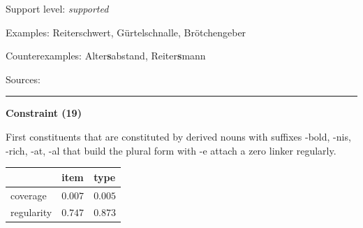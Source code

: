 \vspace{-1.35em}

\noindent
Support level: \textit{supported}

\vspace{0.3em}

\noindent
Examples: Reiter{\zeroLinker}schwert, Gürtel{\zeroLinker}schnalle, Brötchen{\zeroLinker}geber

\noindent
Counterexamples: Alter\textbf{s}abstand, Reiter\textbf{s}mann

\vspace{0.3em}

\noindent
Sources: \citet[56, 82, 106]{ortner_mueller-bollhagen_1991}

\vspace{0.35em}
\hrule




\vspace{0.4em}

\begin{center}
\textbf{Constraint (19)}
\end{center}

\noindent
First constituents that are constituted by derived nouns with suffixes -bold, -nis, -rich, -at, -al that build the plural form with -e attach a zero linker regularly.
\vspace{0.5em}


\vspace{-0.25em}

\begin{table}[!ht]
\begin{center}
\setlength{\extrarowheight}{1pt}
\begin{tabularx}{\columnwidth}{|X|X|X|}
\hline
 & item & type \\
\hline
 coverage & $0.007$ & $0.005$ \\
\hline
 regularity & $0.747$ & $0.873$ \\
\hline
\end{tabularx}
\end{center}
\end{table}

